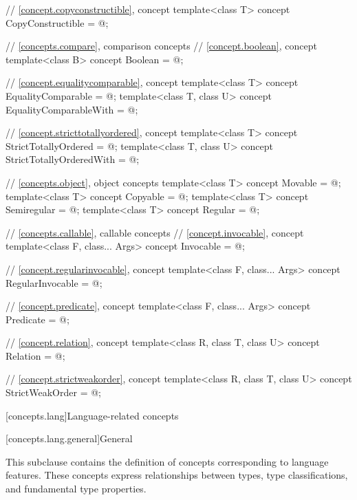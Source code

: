 \begin{codeblock}
{  // \ref{concept.copyconstructible}, concept 
  template<class T>
    concept CopyConstructible = @\seebelow@;

  // \ref{concepts.compare}, comparison concepts
  // \ref{concept.boolean}, concept 
  template<class B>
    concept Boolean = @\seebelow@;

  // \ref{concept.equalitycomparable}, concept 
  template<class T>
    concept EqualityComparable = @\seebelow@;
  template<class T, class U>
    concept EqualityComparableWith = @\seebelow@;

  // \ref{concept.stricttotallyordered}, concept 
  template<class T>
    concept StrictTotallyOrdered = @\seebelow@;
  template<class T, class U>
    concept StrictTotallyOrderedWith = @\seebelow@;

  // \ref{concepts.object}, object concepts
  template<class T>
    concept Movable = @\seebelow@;
  template<class T>
    concept Copyable = @\seebelow@;
  template<class T>
    concept Semiregular = @\seebelow@;
  template<class T>
    concept Regular = @\seebelow@;

  // \ref{concepts.callable}, callable concepts
  // \ref{concept.invocable}, concept 
  template<class F, class... Args>
    concept Invocable = @\seebelow@;

  // \ref{concept.regularinvocable}, concept 
  template<class F, class... Args>
    concept RegularInvocable = @\seebelow@;

  // \ref{concept.predicate}, concept 
  template<class F, class... Args>
    concept Predicate = @\seebelow@;

  // \ref{concept.relation}, concept 
  template<class R, class T, class U>
    concept Relation = @\seebelow@;

  // \ref{concept.strictweakorder}, concept 
  template<class R, class T, class U>
    concept StrictWeakOrder = @\seebelow@;
}
\end{codeblock}

[concepts.lang]{Language-related concepts}

[concepts.lang.general]{General}

\pnum
This subclause contains the definition of concepts corresponding to language
features. These concepts express relationships between types, type
classifications, and fundamental type properties.

